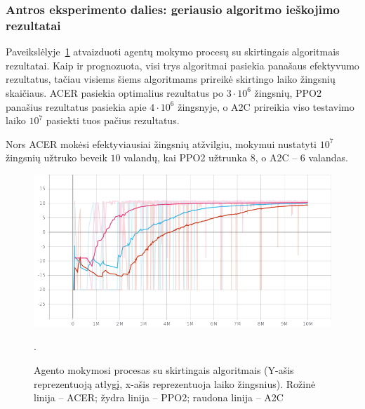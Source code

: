 \documentclass{VUMIFPSbakalaurinis}
\begin{document}
\subsubsection{Antros eksperimento dalies: geriausio algoritmo ieškojimo rezultatai}
{
	Paveikslėlyje~\ref{img:algorithms_graph} atvaizduoti agentų mokymo procesų su skirtingais algoritmais rezultatai. Kaip ir prognozuota, visi trys algoritmai pasiekia panašaus efektyvumo rezultatus, tačiau visiems šiems algoritmams prireikė skirtingo laiko žingsnių skaičiaus. ACER pasiekia optimalius rezultatus po \(3\cdot10^6\) žingsnių, PPO2 panašius rezultatus pasiekia apie \(4\cdot10^6\) žingsnyje, o A2C prireikia viso testavimo laiko \(10^7\) pasiekti tuos pačius rezultatus.\par
	Nors ACER mokėsi efektyviausiai žingsnių atžvilgiu, mokymui nustatyti \(10^7\) žingsnių užtruko  beveik \(10\) valandų, kai PPO2 užtrunka \(8\), o A2C -- \(6\) valandas.
	
	\begin{figure}[H]
		\centering
		\includegraphics[scale=0.5]{img/graphs/algorithms}
		\caption{Agento mokymosi procesas su skirtingais algoritmais (Y-ašis reprezentuoją atlygį, x-ašis reprezentuoja laiko žingsnius). Rožinė linija -- ACER; žydra linija -- PPO2; raudona linija -- A2C}.
		\label{img:algorithms_graph}
	\end{figure}
}
\end{document}
